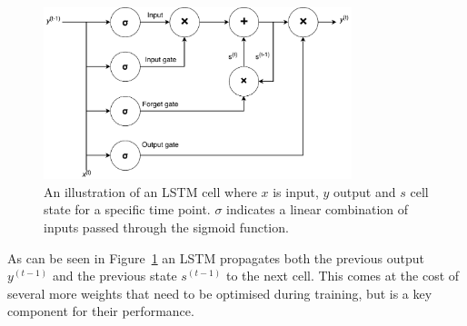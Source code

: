 \begin{figure}[H]
  \centering
  \includegraphics[width=0.8\textwidth]{graphics/lstm}
  \caption{An illustration of an LSTM cell where $x$ is input, $y$ output and $s$ cell state for a specific time point. $\sigma$ indicates a linear combination of inputs passed through the sigmoid function. }\label{fig:lstm-cell}
\end{figure}
As can be seen in Figure~\ref{fig:lstm-cell} an LSTM propagates both the previous output $y^{(t-1)}$ and the previous state $s^{(t-1)}$ to the next cell. This comes at the cost of several more weights that need to be optimised during training, but is a key component for their performance.